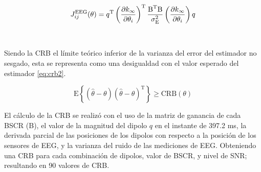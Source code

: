 \begin{equation}
	\label{eq:fisher}
	J_{ij}^{\text{EEG}}(\theta) = q^{\text{T}}\left(\pdv{k_{\infty}}{\theta_{i}}\right)^{\text{T}}\frac{\text{B}^{\text{T}}\text{B}}{\sigma^2_{\text{E}}}\left(\pdv{k_{\infty}}{\theta_{i}}\right)q
\end{equation}

\\

Siendo la CRB el límite teórico inferior de la varianza del error del estimador no sesgado, esta se representa como una desigualdad con el valor esperado del estimador \cref{eq:crb2}.

\begin{equation}
	\label{eq:crb2}
	\text{E}\left\{(\hat{\theta} - \theta)(\hat{\theta} - \theta)^{\text{T}}\right\} \geq \text{CRB}(\theta)
\end{equation}


El cálculo de la CRB se realizó con el uso de la matriz de ganancia de cada BSCR (B), el valor de la magnitud del dipolo $q$ en el instante de 397.2 ms, la derivada parcial de las posiciones de los dipolos con respecto a la posición de los sensores de EEG, y la varianza del ruido de las mediciones de EEG. Obteniendo una CRB para cada combinación de dipolos, valor de BSCR, y nivel de SNR; resultando en 90 valores de CRB.



